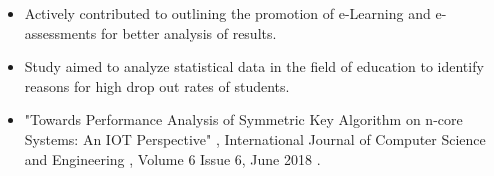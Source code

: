 \documentclass[10pt,a4paper]{altacv}
\begin{document}
\begin{itemize}
\item  Actively contributed to outlining the promotion of e-Learning and e-assessments for better analysis of results.
\end{itemize}

\begin{itemize}
\item Study aimed to analyze statistical data in the field of education to identify reasons for high drop out rates of students.
\end{itemize}


\begin{itemize}
\item "Towards Performance Analysis of Symmetric Key Algorithm on n-core Systems: An IOT Perspective" , International Journal of Computer Science and Engineering , Volume 6 Issue 6, June 2018 .
\end{itemize}



\clearpage
\end{document}
